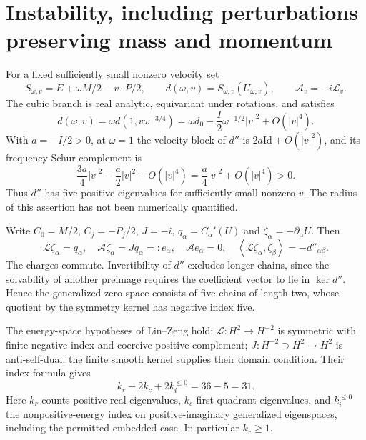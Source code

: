 \documentclass[11pt,a4paper]{article}
\theoremstyle{remark}\newtheorem{remark}[theorem]{Remark}
\newcommand{\ip}[2]{\left\langle #1,#2\right\rangle}
\begin{document}
\section{Instability, including perturbations preserving mass and momentum}
For a fixed sufficiently small nonzero velocity set
\[
 S_{\omega,v}=E+\omega M/2-v\cdot P/2,\qquad
 d(\omega,v)=S_{\omega,v}(U_{\omega,v}),\qquad
 \mathcal A_v=-i\mathcal L_v.
\]
The cubic branch is real analytic, equivariant under rotations, and satisfies
\[
 d(\omega,v)=\omega d(1,v\omega^{-3/4})
 =\omega d_0-\frac I2\omega^{-1/2}|v|^2+O(|v|^4).
\]
With $a=-I/2>0$, at $\omega=1$ the velocity block of $d''$ is $2a\mathrm{Id}+O(|v|^2)$, and its frequency Schur complement is
\[
 \frac{3a}{4}|v|^2-\frac a2|v|^2+O(|v|^4)
 =\frac a4|v|^2+O(|v|^4)>0.
\]
Thus $d''$ has five positive eigenvalues for sufficiently small nonzero $v$. The radius of this assertion has not been numerically quantified.

Write $C_0=M/2$, $C_j=-P_j/2$, $J=-i$, $q_\alpha=C_\alpha'(U)$ and $\zeta_\alpha=-\partial_\alpha U$. Then
\[
 \mathcal L\zeta_\alpha=q_\alpha,\quad
 \mathcal A\zeta_\alpha=Jq_\alpha=:e_\alpha,\quad
 \mathcal A e_\alpha=0,\quad
 \ip{\mathcal L\zeta_\alpha}{\zeta_\beta}=-d''_{\alpha\beta}.
\]
The charges commute. Invertibility of $d''$ excludes longer chains, since the solvability of another preimage requires the coefficient vector to lie in $\ker d''$. Hence the generalized zero space consists of five chains of length two, whose quotient by the symmetry kernel has negative index five.

The energy-space hypotheses of Lin--Zeng \cite{LZ} hold: $\mathcal L:H^2\to H^{-2}$ is symmetric with finite negative index and coercive positive complement; $J:H^{-2}\supset H^2\to H^2$ is anti-self-dual; the finite smooth kernel supplies their domain condition. Their index formula gives
\begin{equation}\label{eq:index}
 k_r+2k_c+2k_i^{\le0}=36-5=31.
\end{equation}
Here $k_r$ counts positive real eigenvalues, $k_c$ first-quadrant eigenvalues, and $k_i^{\le0}$ the nonpositive-energy index on positive-imaginary generalized eigenspaces, including the permitted embedded case. In particular $k_r\ge1$.
\end{document}
